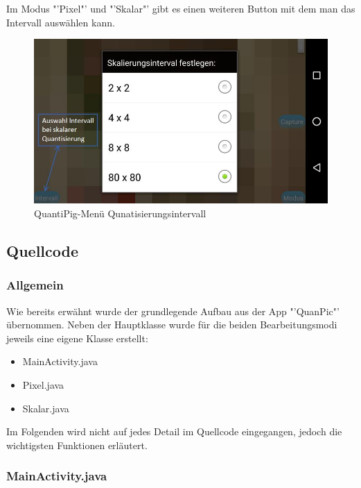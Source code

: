 \begin{description}
Im Modus "'Pixel"' und "'Skalar"' gibt es einen weiteren Button mit dem man das Intervall auswählen kann.

\begin{figure}[h!]
	\centering
		\includegraphics[width=1.0\textwidth]{img/Intervall_QuantiPig.jpg}
	\caption[QuantiPig-Menü Qunatisierungsintervall]{QuantiPig-Menü Qunatisierungsintervall}
	\label{fig:pig_intervall}
\end{figure}


\clearpage

\newpage
\subsection{Quellcode}
\subsubsection{Allgemein}

Wie bereits erwähnt wurde der grundlegende Aufbau aus der App "'QuanPic"' übernommen. Neben der Hauptklasse wurde für die beiden Bearbeitungsmodi jeweils eine eigene Klasse erstellt:
\begin{itemize}
	\item MainActivity.java
	\item Pixel.java
	\item Skalar.java
\end{itemize}
Im Folgenden wird nicht auf jedes Detail im Quellcode eingegangen, jedoch die wichtigsten Funktionen erläutert.

\subsubsection{MainActivity.java}
\label{mainactivity}


\end{description}
